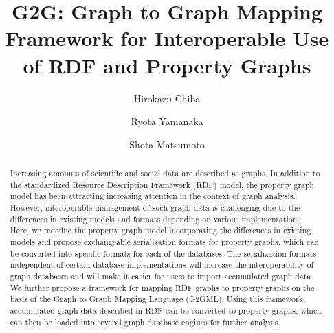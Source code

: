 \documentclass[runningheads]{llncs}
\begin{document}
\newtheorem{defi}[theorem]{Definition}
%
\title{G2G: Graph to Graph Mapping Framework for Interoperable Use of RDF and Property Graphs}
%
%
\author{Hirokazu Chiba \and Ryota Yamanaka \and Shota Matsumoto}
%
%
%
\maketitle              %
%
\begin{abstract}
Increasing amounts of scientific and social data are described as graphs. In addition to the standardized Resource Description Framework (RDF) model, the property graph model has been attracting increasing attention in the context of graph analysis. 
However, interoperable management of such graph data is challenging due to the differences in existing models and formats depending on various implementations. Here, we redefine the property graph model incorporating the differences in existing models and propose exchangeable serialization formats for property graphs, which can be converted into specific formats for each of the databases. 
The serialization formats independent of certain database implementations will increase the interoperability of graph databases and will make it easier for users to import accumulated graph data.
We further propose a framework for mapping RDF graphs to property graphs on the basis of the Graph to Graph Mapping Language (G2GML). Using this framework, accumulated graph data described in RDF can be converted to property graphs, which can then be loaded into several graph database engines for further analysis. 

\end{abstract}
\end{document}
